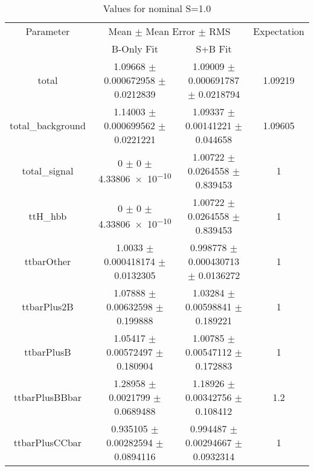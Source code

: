 \begin{table}
\centering
\caption{Values for nominal S=1.0}
\begin{tabular}{cccc}
\toprule
Parameter & \multicolumn{2}{c}{Mean $\pm$ Mean Error $\pm$ RMS} & Expectation\\
 & B-Only Fit & S+B Fit & \\
\midrule
total & \num{1.09668} $\pm$ \num{0.000672958} $\pm$ \num{0.0212839} & \num{1.09009} $\pm$ \num{0.000691787} $\pm$ \num{0.0218794} & \num{1.09219}\\
total\_background & \num{1.14003} $\pm$ \num{0.000699562} $\pm$ \num{0.0221221} & \num{1.09337} $\pm$ \num{0.00141221} $\pm$ \num{0.044658} & \num{1.09605}\\
total\_signal & \num{0} $\pm$ \num{0} $\pm$ \num{4.33806e-10} & \num{1.00722} $\pm$ \num{0.0264558} $\pm$ \num{0.839453} & \num{1}\\
ttH\_hbb & \num{0} $\pm$ \num{0} $\pm$ \num{4.33806e-10} & \num{1.00722} $\pm$ \num{0.0264558} $\pm$ \num{0.839453} & \num{1}\\
ttbarOther & \num{1.0033} $\pm$ \num{0.000418174} $\pm$ \num{0.0132305} & \num{0.998778} $\pm$ \num{0.000430713} $\pm$ \num{0.0136272} & \num{1}\\
ttbarPlus2B & \num{1.07888} $\pm$ \num{0.00632598} $\pm$ \num{0.199888} & \num{1.03284} $\pm$ \num{0.00598841} $\pm$ \num{0.189221} & \num{1}\\
ttbarPlusB & \num{1.05417} $\pm$ \num{0.00572497} $\pm$ \num{0.180904} & \num{1.00785} $\pm$ \num{0.00547112} $\pm$ \num{0.172883} & \num{1}\\
ttbarPlusBBbar & \num{1.28958} $\pm$ \num{0.0021799} $\pm$ \num{0.0689488} & \num{1.18926} $\pm$ \num{0.00342756} $\pm$ \num{0.108412} & \num{1.2}\\
ttbarPlusCCbar & \num{0.935105} $\pm$ \num{0.00282594} $\pm$ \num{0.0894116} & \num{0.994487} $\pm$ \num{0.00294667} $\pm$ \num{0.0932314} & \num{1}\\
\bottomrule
\end{tabular}
\end{table}